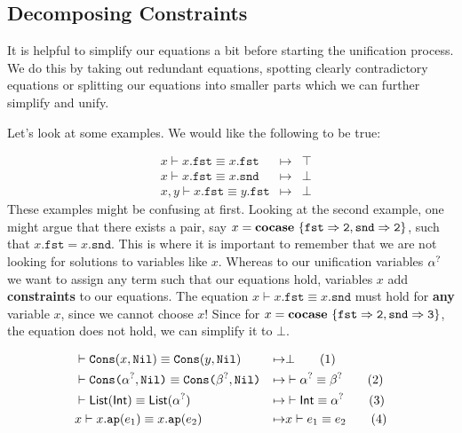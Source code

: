 \documentclass[twoside,12pt,a4paper]{article}
\begin{document}
\subsection{Decomposing Constraints}

It is helpful to simplify our equations a bit before starting the unification process.
We do this by taking out redundant equations, spotting clearly contradictory equations or splitting our equations into smaller parts which we can further simplify and unify.

Let's look at some examples. We would like the following to be true:
\begin{example}
    \begin{align*}
    &x \vdash x.\mathtt{fst} \equiv x.\mathtt{fst} &\mapsto& \top
    \tag{1}\\
    &x \vdash x.\mathtt{fst} \equiv x.\mathtt{snd} &\mapsto& \bot 
    \tag{2}\\
    &x,y \vdash x.\mathtt{fst} \equiv y.\mathtt{fst} &\mapsto& \bot 
    \tag{3}
    \end{align*}
    These examples might be confusing at first. Looking at the second example, one might argue that there exists a pair, say $x = \textbf{cocase}\ \{\mathtt{fst\Rightarrow 2, snd\Rightarrow 2}\}$, such that
    $x.\mathtt{fst} = x.\mathtt{snd}$. This is where it is important to remember that we are not looking for solutions to variables like $x$.
    Whereas to our unification variables $\alpha^?$ we want to assign any term such that our equations hold, variables $x$ add \textbf{constraints} to our equations. 
    The equation $x \vdash x.\mathtt{fst} \equiv x.\mathtt{snd}$ must hold for \textbf{any} variable $x$, since we cannot choose $x$! 
    Since for $x = \textbf{cocase}\ \{\mathtt{fst\Rightarrow 2, snd\Rightarrow 3}\}$, the equation does not hold, we can simplify it to $\bot$.
\end{example}

\begin{example}
    \begin{align*}
    &\vdash \mathtt{Cons(}x, \mathtt{Nil}\mathtt{)} \equiv \mathtt{Cons(}y, \mathtt{Nil}\mathtt{)}&\mapsto& \bot
    \tag{1}\\
    &\vdash \texttt{Cons(}\alpha^?, \texttt{Nil)}\equiv\texttt{Cons(}\beta^?, \texttt{Nil)}
    &\mapsto&\vdash \alpha^?\equiv \beta^?
    \tag{2}\\
    &\vdash \mathsf{List(Int)}\equiv \mathsf{List(\alpha^?)}
    &\mapsto& \vdash \mathsf{Int}\equiv \alpha^?
    \tag{3}\\
    &x \vdash x.\texttt{ap}(e_1)\equiv x.\texttt{ap}(e_2) &\mapsto& x\vdash e_1\equiv e_2 
    \tag{4}
    \end{align*}
\end{example}
\end{document}
